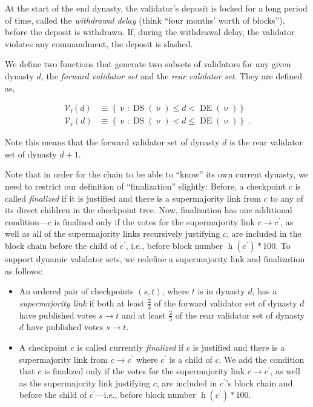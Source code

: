 \documentclass[12pt]{article}
\newcommand{\h}{\operatorname{h}\xspace}
\newcommand{\DS}{\operatorname{DS}}
\newcommand{\DE}{\operatorname{DE}}
\begin{document}
At the start of the end dynasty, the validator's deposit is locked for a long period of time, called the \textit{withdrawal delay} (think ``four months' worth of blocks''), before the deposit is withdrawn.  If, during the withdrawal delay, the validator violates any commandment, the deposit is slashed.

We define two functions that generate two subsets of validators for any given dynasty $d$, the \emph{forward validator set} and the \emph{rear validator set}.  They are defined as,

\begin{align*}
    \mathcal{V}_{\operatorname{f}}(d) &\equiv \left\{ \upnu : \DS(\upnu) \leq d < \DE(\upnu)  \right\} \\
    \mathcal{V}_{\operatorname{r}}(d) &\equiv \left\{ \upnu : \DS(\upnu) < d \leq \DE(\upnu) \right\} \; .
\end{align*}


Note this means that the forward validator set of dynasty $d$ is the rear validator set of dynasty $d+1$.

Note that in order for the chain to be able to ``know'' its own current dynasty, we need to restrict our definition of ``finalization'' slightly:		
Before, a checkpoint $c$ is called \emph{finalized} if it is justified and there is a supermajority link from $c$ to any of its direct children in the checkpoint tree.  Now, finalization has one additional condition---$c$ is finalized only if the votes for the supermajority link $c \rightarrow c^\prime$, as well as all of the supermajority links recursively justifying $c$, are included in the block chain before the child of $c^\prime$, i.e., before block number $\h(c^\prime) * 100$.		
To support dynamic validator sets, we redefine a supermajority link and finalization as follows:
\begin{itemize}

\item An ordered pair of checkpoints $(s, t)$, where $t$ is in dynasty $d$, has a \emph{supermajority link} if both at least $\frac{2}{3}$ of the forward validator set of dynasty $d$ have published votes $s \rightarrow t$ and at least $\frac{2}{3}$ of the rear validator set of dynasty $d$ have published votes $s \rightarrow t$.

\item A checkpoint $c$ is called currently \emph{finalized} if $c$ is justified and there is a supermajority link from $c \to c^\prime$ where $c^\prime$ is a child of $c$.  We add the condition that $c$ is finalized only if the votes for the supermajority link $c \rightarrow c^\prime$, as well as the supermajority link justifying $c$, are included in $c^\prime$'s  block chain and before the child of $c^\prime$---i.e., before block number $\h(c^\prime) * 100$.
\end{itemize}
\end{document}
